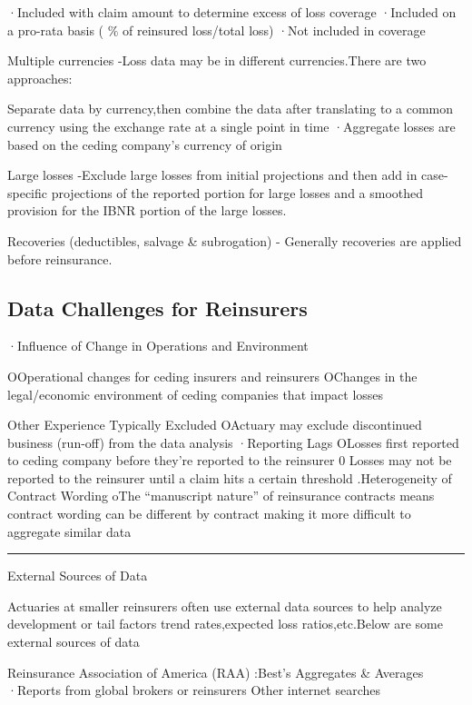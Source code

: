 \documentclass[
]{article}
\begin{document}
·Included with claim amount to determine excess of loss coverage
·Included on a pro-rata basis ( \(\%\) of reinsured loss/total loss)
·Not included in coverage

Multiple currencies -Loss data may be in different currencies.There are
two approaches:

Separate data by currency,then combine the data after translating to a
common currency using the exchange rate at a single point in time
·Aggregate losses are based on the ceding company's currency of origin

Large losses -Exclude large losses from initial projections and then add
in case-specific projections of the reported portion for large losses
and a smoothed provision for the IBNR portion of the large losses.

Recoveries (deductibles, salvage \& subrogation) - Generally recoveries
are applied before reinsurance.

\subsection{Data Challenges for
Reinsurers}\label{data-challenges-for-reinsurers}

·Influence of Change in Operations and Environment

OOperational changes for ceding insurers and reinsurers OChanges in the
legal/economic environment of ceding companies that impact losses

Other Experience Typically Excluded OActuary may exclude discontinued
business (run-off) from the data analysis ·Reporting Lags OLosses first
reported to ceding company before they're reported to the reinsurer 0
Losses may not be reported to the reinsurer until a claim hits a certain
threshold .Heterogeneity of Contract Wording oThe ``manuscript nature''
of reinsurance contracts means contract wording can be different by
contract making it more difficult to aggregate similar data

\begin{center}\rule{0.5\linewidth}{0.5pt}\end{center}

External Sources of Data

Actuaries at smaller reinsurers often use external data sources to help
analyze development or tail factors trend rates,expected loss
ratios,etc.Below are some external sources of data

Reinsurance Association of America (RAA) :Best's Aggregates \& Averages
·Reports from global brokers or reinsurers Other internet searches
\end{document}
